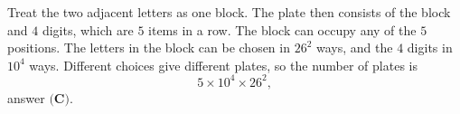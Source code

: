 Treat the two adjacent letters as one block. The plate then consists of the block and $4$ digits, which are $5$ items in a row. The block can occupy any of the $5$ positions. The letters in the block can be chosen in $26^2$ ways, and the $4$ digits in $10^4$ ways. Different choices give different plates, so the number of plates is
\[
5\times10^4\times26^2 ,
\]
answer $\boxed{\textbf{(C)}}$.
